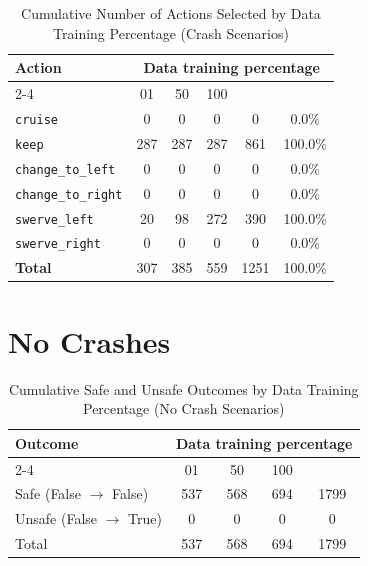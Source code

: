 \documentclass{article}
\begin{document}
\begin{table}[h]
\centering
\caption{Cumulative Number of Actions Selected by Data Training Percentage (Crash Scenarios)}
\begin{tabular}{l|ccc|c|c}
\toprule
\multirow{2}{*}{Action} & \multicolumn{5}{c|}{Data training percentage} & \multirow{2}{*}{Total} & \multirow{2}{*}{Safe (\%)} \\
\cmidrule{2-4}
 & 01 & 50 & 100 & & \\
\midrule
\texttt{cruise} & 0 & 0 & 0 & 0 & 0.0\% \\ 
\texttt{keep} & 287 & 287 & 287 & 861 & 100.0\% \\ 
\texttt{change\_to\_left} & 0 & 0 & 0 & 0 & 0.0\% \\ 
\texttt{change\_to\_right} & 0 & 0 & 0 & 0 & 0.0\% \\ 
\texttt{swerve\_left} & 20 & 98 & 272 & 390 & 100.0\% \\ 
\texttt{swerve\_right} & 0 & 0 & 0 & 0 & 0.0\% \\ 
\midrule
\textbf{Total} & 307 & 385 & 559 & 1251 & 100.0\% \\ 
\bottomrule
\end{tabular}
\end{table}

\pagebreak
\section{No Crashes}

\begin{table}[h]
\centering
\caption{Cumulative Safe and Unsafe Outcomes by Data Training Percentage (No Crash Scenarios)}
\begin{tabular}{l|ccc|c}
\toprule
\multirow{2}{*}{Outcome} & \multicolumn{5}{c|}{Data training percentage} & \multirow{2}{*}{Total} \\
\cmidrule{2-4}
 & 01 & 50  & 100 & \\
\midrule
Safe (False $\rightarrow$ False) & 537 & 568 & 694 & 1799 \\ 
Unsafe (False $\rightarrow$ True) & 0 & 0 & 0 & 0 \\ 
\midrule
Total & 537 & 568 & 694 & 1799 \\ 
\bottomrule
\end{tabular}
\end{table}
\end{document}
